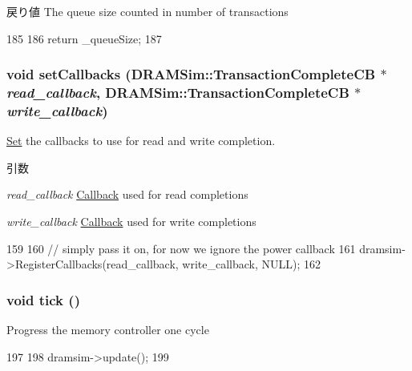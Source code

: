 \begin{DoxyReturn}{戻り値}
The queue size counted in number of transactions 
\end{DoxyReturn}



\begin{DoxyCode}
185 {
186     return _queueSize;
187 }
\end{DoxyCode}
\hypertarget{classDRAMSim2Wrapper_ae7cabadc2302c5b4899c5db3b66b2549}{
\subsubsection[{setCallbacks}]{\setlength{\rightskip}{0pt plus 5cm}void setCallbacks (DRAMSim::TransactionCompleteCB $\ast$ {\em read\_\-callback}, \/  DRAMSim::TransactionCompleteCB $\ast$ {\em write\_\-callback})}}
\label{classDRAMSim2Wrapper_ae7cabadc2302c5b4899c5db3b66b2549}
\hyperlink{classSet}{Set} the callbacks to use for read and write completion.


\begin{DoxyParams}{引数}
\item[{\em read\_\-callback}]\hyperlink{classCallback}{Callback} used for read completions \item[{\em write\_\-callback}]\hyperlink{classCallback}{Callback} used for write completions \end{DoxyParams}



\begin{DoxyCode}
159 {
160     // simply pass it on, for now we ignore the power callback
161     dramsim->RegisterCallbacks(read_callback, write_callback, NULL);
162 }
\end{DoxyCode}
\hypertarget{classDRAMSim2Wrapper_a873dd91783f9efb4a590aded1f70d6b0}{
\subsubsection[{tick}]{\setlength{\rightskip}{0pt plus 5cm}void tick ()}}
\label{classDRAMSim2Wrapper_a873dd91783f9efb4a590aded1f70d6b0}
Progress the memory controller one cycle 


\begin{DoxyCode}
197 {
198     dramsim->update();
199 }
\end{DoxyCode}


